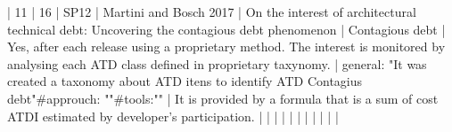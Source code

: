 | 11 |         16 | SP12 | Martini and Bosch 2017                                               | On the interest of architectural technical debt: Uncovering the contagious debt phenomenon                                                                               | Contagious debt                                                                                                                                                                                                                                          | Yes, after each release using a proprietary method. The interest is monitored by analysing each ATD class defined in proprietary taxynomy.                                                                                                                           | general: "It was created a taxonomy about ATD itens to identify ATD Contagius debt"#approuch: ""#tools:""                                                                                                                                                                                                | It is provided by a formula that is a sum of cost ATDI estimated by developer's participation.                                                                                                                                                                                                                                                                                                                                                                                           |
|    |            |      |                                                                      |                                                                                                                                                                          |                                                                                                                                                                                                                                                            |                                                                                                                                                                                                                                                                      |                                                                                                                                                                                                                                                                                                          |                                                                                                                                                                                                                                                                                                                                                                                                                                                                                              |
